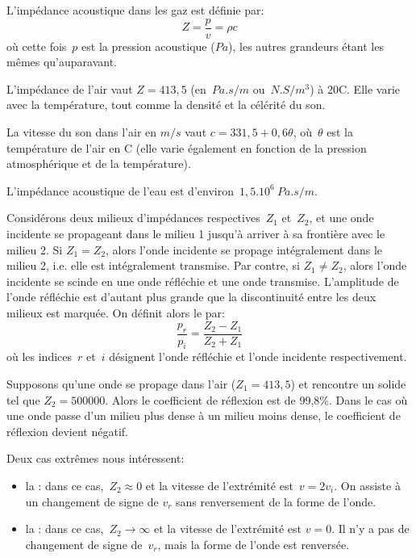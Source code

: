 \medskip
L'impédance acoustique dans les gaz est définie par:
\begin{equation}
Z = \dfrac{p}{v}=\rho c
\end{equation}
où cette fois~$p$ est la pression acoustique ($Pa$), les autres grandeurs étant les mêmes qu'auparavant.

\medskip{}
L'impédance de l'air vaut $Z=413,5$ (en~$Pa.s/m$ ou~$N.S/m^3$) à 20\degre C. Elle varie avec la température, tout comme la densité et la célérité du son.

La vitesse du son dans l'air en $m/s$ vaut $c=331,5+0,6\theta$, où~$\theta$ est la température de l'air en \degre C (elle varie également en fonction de la pression atmosphérique et de la température).

L'impédance acoustique de l'eau est d'environ~$1,5.10^6 ~Pa.s/m$.

\medskip{}
Considérons deux milieux d'impédances respectives~$Z_1$ et~$Z_2$, et une onde incidente se propageant dans le milieu 1 jusqu'à arriver à sa frontière avec le milieu 2.
Si $Z_1=Z_2$, alors l'onde incidente se propage intégralement dans le milieu 2, i.e. elle est intégralement transmise.
Par contre, si $Z_1\ne Z_2$, alors l'onde incidente se scinde en une onde réfléchie et une onde transmise. L'amplitude de l'onde réfléchie est d'autant plus grande que la discontinuité entre les deux milieux est marquée.
On définit alors le  par:
\begin{equation}
\dfrac{p_r}{p_i}=\dfrac{Z_2-Z_1}{Z_2+Z_1}
\end{equation}
où les indices~$r$ et~$i$ désignent l'onde réfléchie et l'onde incidente respectivement.

\medskip{}
Supposons qu'une onde se propage dans l'air ($Z_1=413,5$) et rencontre un solide tel que $Z_2=500 000$. Alors le coefficient de réflexion est de 99,8\%.
Dans le cas où une onde passe d'un milieu plus dense à un milieu moins dense, le coefficient de réflexion devient négatif.%

\medskip{}
Deux cas extrêmes nous intéressent:
\begin{itemize}
   \item la : dans ce cas,~$Z_2\approx0$ et la vitesse de l'extrémité est~$v=2v_i$. On assiste à un changement de signe de $v_r$ sans renversement de la forme de l'onde.
   \item la : dans ce cas,~$Z_2\rightarrow\infty$ et la vitesse de l'extrémité est $v=0$. Il n'y a pas de changement de signe de~$v_r$, mais la forme de l'onde est renversée.
\end{itemize}







